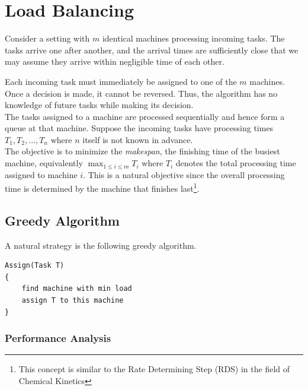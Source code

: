 \vspace{1em}
\section{Load Balancing}

Consider a setting with $m$ identical machines processing incoming tasks. The tasks arrive 
one after another, and the arrival times are sufficiently close that 
we may assume they arrive within negligible time of each other.

Each incoming task must immediately be assigned to one of the $m$ machines. Once a decision is made, 
it cannot be reversed. Thus, the algorithm has no knowledge of future tasks while making its decision.\\

\noindent The tasks assigned to a machine are processed sequentially and hence form a queue at that machine.
Suppose the incoming tasks have processing times $T_1,T_2,\dots,T_n$ where $n$ itself is not known in advance.\\


\noindent The objective is to minimize the \textit{makespan}, the finishing time of the 
busiest machine, equivalently $\max_{1\le i\le m} T_i$ where $T_i$ denotes the total 
processing time assigned to machine $i$. This is a natural objective since the overall processing 
time is determined by the machine that finishes last\footnote{This concept 
is similar to the Rate Determining Step (RDS) in the field of Chemical Kinetics}.


\subsection*{Greedy Algorithm}
A natural strategy is the following greedy algorithm.
\begin{center}
\begin{minipage}{0.9\linewidth}
\begin{framed}
\begin{Verbatim}
Assign(Task T)
{
    find machine with min load
    assign T to this machine
}
\end{Verbatim}
\vspace{-4mm}
\end{framed}
\end{minipage}
\end{center}

\subsubsection*{Performance Analysis}

